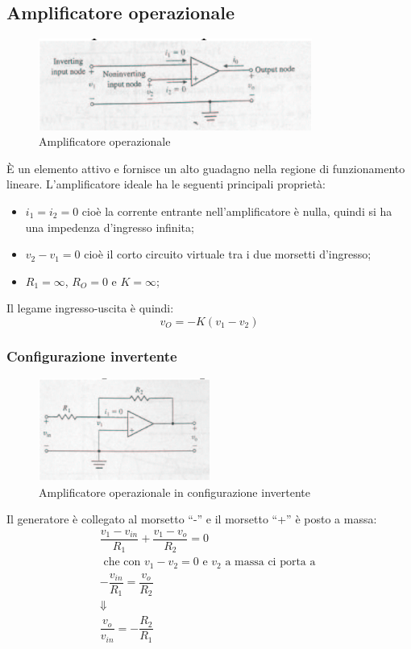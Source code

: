 \documentclass[a4paper]{report}
\begin{document}
\subsection{Amplificatore operazionale}
\begin{figure}[!b]
\centering
\includegraphics[width=0.8\textwidth]{./images/opamp.png}
\caption{Amplificatore operazionale\label{fig:opamp}}
\end{figure}
\`E un elemento attivo e fornisce un alto guadagno nella regione di
funzionamento lineare. L'amplificatore ideale ha le seguenti principali
propriet\`a:
\begin{itemize}
\item $i_1 = i_2 = 0$ cio\`e la corrente entrante nell'amplificatore
  \`e nulla, quindi si ha una impedenza d'ingresso infinita;
\item $v_2 - v_1 = 0$ cio\`e il corto circuito virtuale tra i due
  morsetti d'ingresso;
\item $R_1 = \infty$, $R_O = 0$ e $K = \infty$;
\end{itemize}
Il legame ingresso-uscita \`e quindi:
\[
  v_O = - K (v_1 - v_2)
\]
\subsubsection{Configurazione invertente}
\begin{figure}[!t]
\centering
\includegraphics[width=0.5\textwidth]{./images/opamp02.png}
\caption{Amplificatore operazionale in configurazione invertente\label{fig:opamp-inv}}
\end{figure}
Il generatore \`e collegato al morsetto ``-'' e il morsetto ``+'' \`e
posto a massa:
\[
  \begin{array}{c}
    \dfrac{v_1 - v_{in}}{R_1} + \dfrac{v_1 - v_o}{R_2} = 0\\
    \textrm{ che con } v_1 - v_2 = 0 \textrm{ e } v_2 \textrm{ a massa
    ci porta a }\\
    -\dfrac{v_{in}}{R_1} = \dfrac{v_o}{R_2}\\
    \Downarrow\\
    \dfrac{v_o}{v_{in}} = -\dfrac{R_2}{R_1}
  \end{array}
\]
\end{document}
